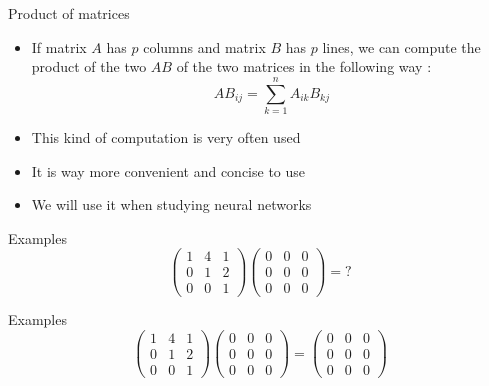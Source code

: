 \documentclass{beamer}
\begin{document}
\begin{frame}{Product of matrices}
    \begin{itemize}
        \item If matrix $A$ has $p$ columns and matrix $B$ has $p$ lines, we
            can compute the product of the two $AB$ of the two matrices in the
            following way : 
            \begin{equation}
                AB_{ij}= \sum^{n}_{k=1} A_{ik}B_{kj}
            \end{equation}
        \item This kind of computation is very often used
        \item It is way more convenient and concise to use
        \item We will use it when studying neural networks
    \end{itemize}
\end{frame}

\begin{frame}{Examples}
   \[
\begin{pmatrix}
1 & 4 & 1 \\
0 & 1 & 2 \\
0 & 0 & 1
\end{pmatrix}
\begin{pmatrix}
0 & 0 & 0 \\
0 & 0 & 0 \\
0 & 0 & 0
\end{pmatrix}
    =\text{?} 
\] 
\end{frame}

\begin{frame}{Examples}
   \[
\begin{pmatrix}
1 & 4 & 1 \\
0 & 1 & 2 \\
0 & 0 & 1
\end{pmatrix}
\begin{pmatrix}
0 & 0 & 0 \\
0 & 0 & 0 \\
0 & 0 & 0
\end{pmatrix}
    =
\begin{pmatrix}
0 & 0 & 0 \\
0 & 0 & 0 \\
0 & 0 & 0
\end{pmatrix}
\] 
\end{frame}
\end{document}

